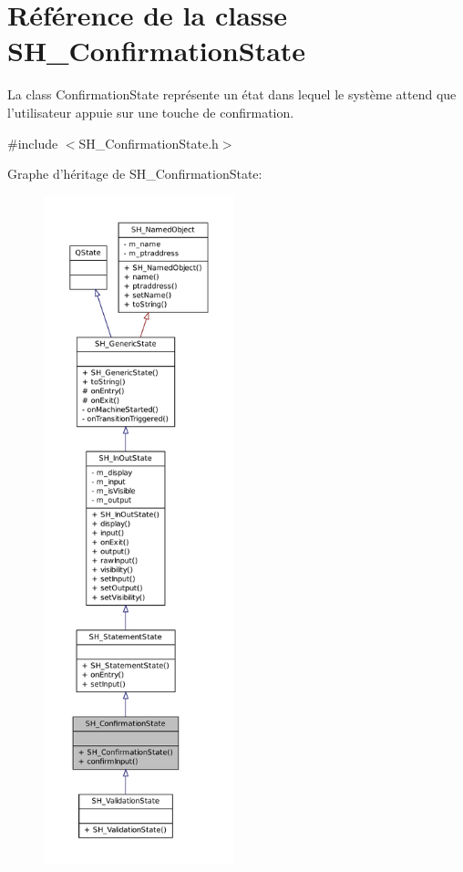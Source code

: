 \hypertarget{classSH__ConfirmationState}{\section{Référence de la classe S\-H\-\_\-\-Confirmation\-State}
\label{classSH__ConfirmationState}
}


La class Confirmation\-State représente un état dans lequel le système attend que l'utilisateur appuie sur une touche de confirmation.  




{\ttfamily \#include $<$S\-H\-\_\-\-Confirmation\-State.\-h$>$}



Graphe d'héritage de S\-H\-\_\-\-Confirmation\-State\-:\nopagebreak
\begin{figure}[H]
\begin{center}
\leavevmode
\includegraphics[height=550pt]{classSH__ConfirmationState__inherit__graph}
\end{center}
\end{figure}



